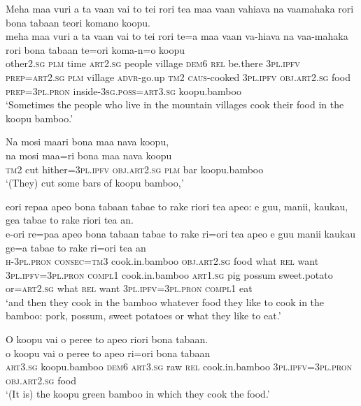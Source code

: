 \ea\label{ex:text6-32}
Meha maa vuri a ta vaan vai to tei rori tea maa vaan vahiava na vaamahaka rori bona tabaan teori komano koopu.\\
\gll meha	maa	vuri	a	ta	vaan	vai	to	tei	rori	te=a	maa	vaan	va-hiava	na	vaa-mahaka	rori	bona	tabaan	te=ori	koma-n=o	koopu\\
     other2.\textsc{sg}	\textsc{plm}	time	\textsc{art}2.\textsc{sg}	people	village	\textsc{dem}6	\textsc{rel}	be.there	3\textsc{pl}.\textsc{ipfv}	\textsc{prep}=\textsc{art}2.\textsc{sg}	\textsc{plm}	village	\textsc{advr}-go.up	\textsc{tm}2	\textsc{caus}-cooked	3\textsc{pl}.\textsc{ipfv}	\textsc{obj}.\textsc{art}2.\textsc{sg}	food	\textsc{prep}=3\textsc{pl}.\textsc{pron}	inside-3\textsc{sg}.\textsc{poss}=\textsc{art}3.\textsc{sg}	koopu.bamboo\\
\glt `Sometimes the people who live in the mountain villages cook their food in the koopu bamboo.'
\z

\ea\label{ex:text6-33}
Na mosi maari bona maa nava koopu,\\
\gll na	mosi	maa=ri	bona	maa	nava	koopu\\
     \textsc{tm}2	cut	hither=3\textsc{pl}.\textsc{ipfv}	\textsc{obj}.\textsc{art}2.\textsc{sg}	\textsc{plm}	bar	koopu.bamboo\\
\glt `(They) cut some bars of koopu bamboo,'
\z

\newpage
\ea\label{ex:text6-34}
eori repaa apeo bona tabaan tabae to rake riori tea apeo: e guu, manii, kaukau, gea tabae to rake riori tea an.\\
\gll e-ori	re=paa	apeo	bona	tabaan	tabae	to	rake	ri=ori	tea	apeo	e	guu	manii	kaukau	ge=a	tabae	to	rake	ri=ori	tea	an\\
     \textsc{h}-3\textsc{pl}.\textsc{pron}	\textsc{consec}=\textsc{tm}3	cook.in.bamboo	\textsc{obj}.\textsc{art}2.\textsc{sg}	food	what	\textsc{rel}	want	3\textsc{pl}.\textsc{ipfv}=3\textsc{pl}.\textsc{pron}	\textsc{compl}1	cook.in.bamboo	\textsc{art}1.\textsc{sg}	pig	possum	sweet.potato	or=\textsc{art}2.\textsc{sg}	what	\textsc{rel}	want	3\textsc{pl}.\textsc{ipfv}=3\textsc{pl}.\textsc{pron}	\textsc{compl}1	eat\\
\glt `and then they cook in the bamboo whatever food they like to cook in the bamboo: pork, possum, sweet potatoes or what they like to eat.'
\z

\ea\label{ex:text6-35}
O koopu vai o peree to apeo riori bona tabaan.\\
\gll o	koopu	vai	o	peree	to	apeo	ri=ori	bona	tabaan\\
     \textsc{art}3.\textsc{sg}	koopu.bamboo	\textsc{dem}6	\textsc{art}3.\textsc{sg}	raw	\textsc{rel}	cook.in.bamboo	3\textsc{pl}.\textsc{ipfv}=3\textsc{pl}.\textsc{pron}	\textsc{obj}.\textsc{art}2.\textsc{sg}	food\\
\glt `(It is) the koopu green bamboo in which they cook the food.'
\z

